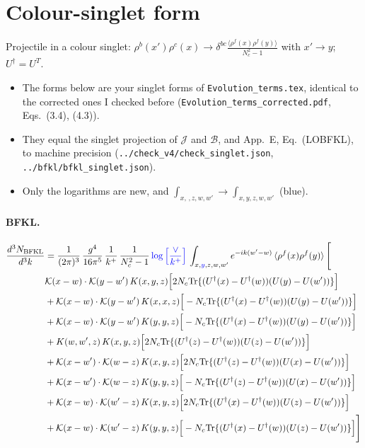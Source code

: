 \documentclass[10pt]{article}
\numberwithin{equation}{section}
\newcommand{\new}[1]{{\color{blue}#1}}
\newcommand{\BB}{\mathcal B}
\newcommand{\JJ}{\mathcal J}
\begin{document}
\section{Colour-singlet form}\label{sec:singlet}
Projectile in a colour singlet: $\rho^b(x')\rho^c(x)\to\delta^{bc}\frac{\langle\rho^f(x)\rho^f(y)\rangle}{N_c^2-1}$ with $x'\to y$; $U^\dagger=U^T$.
\begin{itemize}
\item The forms below are your singlet forms of \texttt{Evolution\_terms.tex}, identical to the corrected ones I checked before (\texttt{Evolution\_terms\_corrected.pdf}, Eqs.~(3.4), (4.3)).
\item They equal the singlet projection of $\JJ$ and $\BB$, and App.~E, Eq.~(LOBFKL), to machine precision (\texttt{../check\_v4/check\_singlet.json}, \texttt{../bfkl/bfkl\_singlet.json}).
\item Only the logarithms are new, and $\int_{x,\,,z,w,w'}\to\int_{x,y,z,w,w'}$ (blue).
\end{itemize}
\paragraph{BFKL.}
\begin{align}
\frac{d^{3}N_{\mathrm{BFKL}}}{d^{3}k} & = \frac{1}{(2\pi)^{3}}\,\frac{g^{4}}{16\pi^{5}}\,\frac{1}{k^{+}}\,\frac{1}{N^{2}_{c}-1}\,\new{\log\Big[\frac{\vee}{k^{+}}\Big]}\,\int_{x,\new{y},z,w,w'}e^{-ik(w'-w)}\,\langle\rho^{f}(x)\rho^{f}(y) \rangle\,\Bigg[ \notag\\ & \mathcal K(x-w)\cdot\mathcal K(y-w')\,K(x,y,z)\Big[2 N_{c}{\rm Tr}\{(U^\dagger(x)-U^\dagger(w))(U(y)-U(w'))\}\Big]\notag\\
&+\mathcal K(x-w)\cdot\mathcal K(y-w')\,K(x,x,z)\Big[-N_{c}{\rm Tr}\{(U^\dagger(x)-U^\dagger(w))(U(y)-U(w'))\}\Big]\notag\\
&+\mathcal K(x-w)\cdot\mathcal K(y-w')\,K(y,y,z)\Big[-N_{c}{\rm Tr}\{(U^\dagger(x)-U^\dagger(w))(U(y)-U(w'))\}\Big]\notag\\
&+K(w,w',z)\,K(x,y,z)\Big[2 N_{c}{\rm Tr}\{(U^\dagger(z)-U^\dagger(w))(U(z)-U(w'))\}\Big]\notag\\
&+\mathcal K(x-w')\cdot\mathcal K(w-z)\,K(x,y,z)\Big[2 N_{c}{\rm Tr}\{(U^\dagger(z)-U^\dagger(w))(U(x)-U(w'))\}\Big]\notag\\
&+\mathcal K(x-w')\cdot\mathcal K(w-z)\,K(y,y,z)\Big[-N_{c}{\rm Tr}\{(U^\dagger(z)-U^\dagger(w))(U(x)-U(w'))\}\Big]\notag\\
&+\mathcal K(x-w)\cdot\mathcal K(w'-z)\,K(x,y,z)\Big[2 N_{c}{\rm Tr}\{(U^\dagger(x)-U^\dagger(w))(U(z)-U(w'))\}\Big]\notag\\
&+\mathcal K(x-w)\cdot\mathcal K(w'-z)\,K(y,y,z)\Big[-N_{c}{\rm Tr}\{(U^\dagger(x)-U^\dagger(w))(U(z)-U(w'))\}\Big]\Bigg]
\label{eq:BS}
\end{align}
\end{document}
